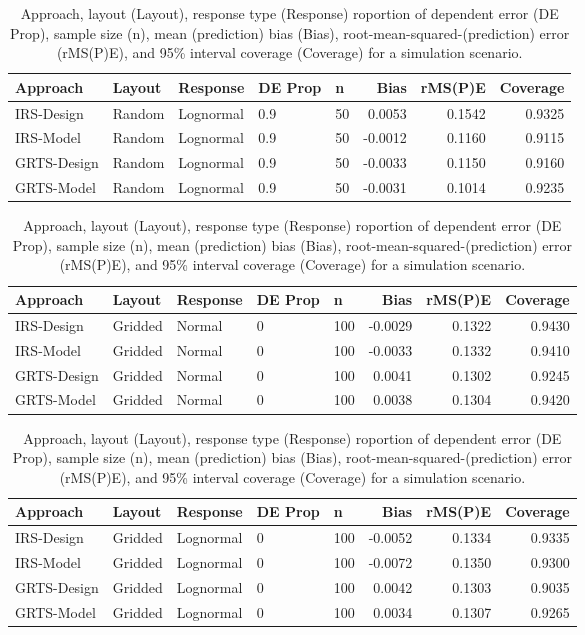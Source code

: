 \documentclass[]{elsarticle} %
\begin{document}
\begin{table}[ht]
\centering
\begin{tabular}{lllllrrr}
  \hline
Approach & Layout & Response & DE Prop & n & Bias & rMS(P)E & Coverage \\ 
  \hline
IRS-Design & Random & Lognormal & 0.9 & 50 & 0.0053 & 0.1542 & 0.9325 \\ 
  IRS-Model & Random & Lognormal & 0.9 & 50 & -0.0012 & 0.1160 & 0.9115 \\ 
  GRTS-Design & Random & Lognormal & 0.9 & 50 & -0.0033 & 0.1150 & 0.9160 \\ 
  GRTS-Model & Random & Lognormal & 0.9 & 50 & -0.0031 & 0.1014 & 0.9235 \\ 
   \hline
\end{tabular}
\caption{Approach, layout (Layout), response type (Response) roportion of dependent error (DE Prop), sample size (n), mean (prediction) bias (Bias), root-mean-squared-(prediction) error (rMS(P)E), and 95\% interval coverage (Coverage) for a simulation scenario.} 
\end{table}
\begin{table}[ht]
\centering
\begin{tabular}{lllllrrr}
  \hline
Approach & Layout & Response & DE Prop & n & Bias & rMS(P)E & Coverage \\ 
  \hline
IRS-Design & Gridded & Normal & 0 & 100 & -0.0029 & 0.1322 & 0.9430 \\ 
  IRS-Model & Gridded & Normal & 0 & 100 & -0.0033 & 0.1332 & 0.9410 \\ 
  GRTS-Design & Gridded & Normal & 0 & 100 & 0.0041 & 0.1302 & 0.9245 \\ 
  GRTS-Model & Gridded & Normal & 0 & 100 & 0.0038 & 0.1304 & 0.9420 \\ 
   \hline
\end{tabular}
\caption{Approach, layout (Layout), response type (Response) roportion of dependent error (DE Prop), sample size (n), mean (prediction) bias (Bias), root-mean-squared-(prediction) error (rMS(P)E), and 95\% interval coverage (Coverage) for a simulation scenario.} 
\end{table}
\begin{table}[ht]
\centering
\begin{tabular}{lllllrrr}
  \hline
Approach & Layout & Response & DE Prop & n & Bias & rMS(P)E & Coverage \\ 
  \hline
IRS-Design & Gridded & Lognormal & 0 & 100 & -0.0052 & 0.1334 & 0.9335 \\ 
  IRS-Model & Gridded & Lognormal & 0 & 100 & -0.0072 & 0.1350 & 0.9300 \\ 
  GRTS-Design & Gridded & Lognormal & 0 & 100 & 0.0042 & 0.1303 & 0.9035 \\ 
  GRTS-Model & Gridded & Lognormal & 0 & 100 & 0.0034 & 0.1307 & 0.9265 \\ 
   \hline
\end{tabular}
\caption{Approach, layout (Layout), response type (Response) roportion of dependent error (DE Prop), sample size (n), mean (prediction) bias (Bias), root-mean-squared-(prediction) error (rMS(P)E), and 95\% interval coverage (Coverage) for a simulation scenario.} 
\end{table}
\end{document}
